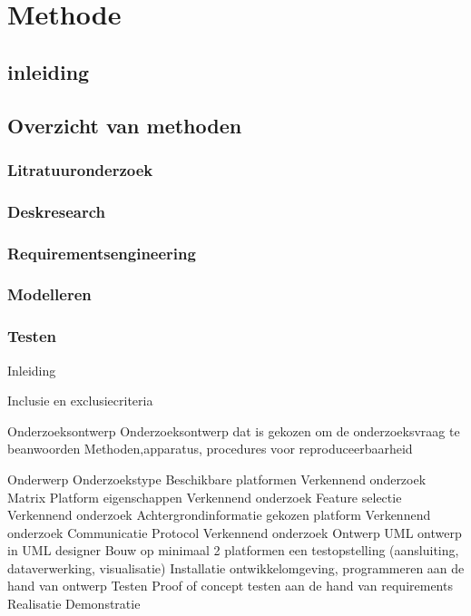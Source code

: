 \newpage
\section{Methode}

\subsection{inleiding}

\subsection{Overzicht van methoden}

\subsubsection{Litratuuronderzoek}

\subsubsection{Deskresearch}

\subsubsection{Requirementsengineering}

\subsubsection{Modelleren}


\subsubsection{Testen}


Inleiding

Inclusie en exclusiecriteria

Onderzoeksontwerp
Onderzoeksontwerp dat is gekozen om de onderzoeksvraag te beanwoorden
Methoden,apparatus, procedures voor reproduceerbaarheid


Onderwerp
Onderzoekstype
Beschikbare platformen
Verkennend onderzoek
Matrix Platform eigenschappen
Verkennend onderzoek
Feature selectie
Verkennend onderzoek
Achtergrondinformatie gekozen platform
Verkennend onderzoek
Communicatie Protocol
Verkennend onderzoek
Ontwerp
UML ontwerp in UML designer
Bouw op minimaal 2 platformen een testopstelling (aansluiting, dataverwerking, visualisatie) 
Installatie ontwikkelomgeving, programmeren aan de hand van ontwerp
Testen 
Proof of concept testen aan de hand van requirements
Realisatie
Demonstratie

